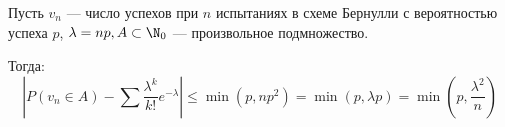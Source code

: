 \begin{theorem}
    Пусть \(v_n\) --- число успехов при \(n\) испытаниях в схеме Бернулли с вероятностью успеха \(p\), \(\lambda = np, A \subset \N_0\) --- произвольное подмножество.

    Тогда:
    \[\left|P(v_n\in A) - \sum \frac{\lambda^k}{k!} e^{ - \lambda}\right| \leq \min (p, np^2) = \min (p, \lambda p) = \min\left(p, \frac{\lambda^2}{n}\right)\]
\end{theorem}
